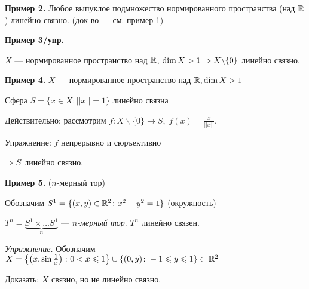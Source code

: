 \documentclass[../../main.tex]{subfiles}
\begin{document}
\vspace{10pt}

\textbf{Пример 2.} Любое выпуклое подмножество нормированного пространства (над $\mathbb{R}$) линейно связно. (док-во — см. пример 1)

\textbf{Пример 3/упр.}

$X$ — нормированное пространство над $\mathbb{R}$, $\dim X > 1 \Rightarrow X \backslash \{ 0 \}$ линейно связно.

\vspace{10pt}

\begin{minipage}{0.65\linewidth}
\textbf{Пример 4.} $X$ — нормированное пространство над $\mathbb{R}, \dim X > 1$

Сфера $S = \lbrace x \in X \colon ||x|| = 1 \rbrace$ линейно связна

Действительно: рассмотрим $f \colon X \backslash \{ 0\} \to S, \; f(x) = \frac{x}{||x||}$.

Упражнение: $f$ непрерывно и сюръективно

$\Rightarrow S$ линейно связно.
\end{minipage}
\begin{minipage}{0.3\linewidth}
\end{minipage}

\vspace{10pt}


\textbf{Пример 5.} ($n$-мерный тор)

Обозначим $S^1 = \lbrace (x, y) \in \mathbb{R}^2 \colon x^2 + y^2 = 1 \rbrace$ (окружность)

$T^n = \underbrace{S^1 \times \ldots S^1}_{n}$ — \textit{$n$-мерный тор}. $T^n$ линейно связен.

\textit{Упражнение.} Обозначим $X = \left\{ \left(x, \sin\frac 1 x\right) \colon 0 < x \leqslant 1 \right\} \cup \lbrace (0, y) \colon -1 \leqslant y \leqslant 1 \rbrace \subset \mathbb{R}^2$

\begin{minipage}{0.4\linewidth}
\end{minipage}
\begin{minipage}{0.6\linewidth}
Доказать: $X$ связно, но не линейно связно.
\end{minipage}
\end{document}
